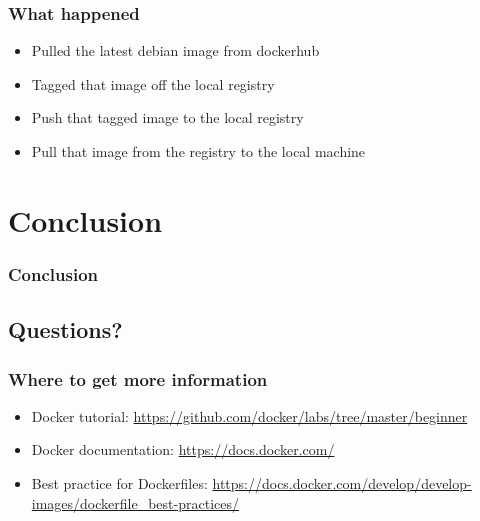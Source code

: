 \documentclass[aspectratio=169,11pt,hyperref={colorlinks=true}]{beamer}
\begin{document}
\begin{frame}
    \frametitle{What happened}
    \begin{itemize}
        \item Pulled the latest debian image from dockerhub
        \item Tagged that image off the local registry
        \item Push that tagged image to the local registry
        \item Pull that image from the registry to the local machine
    \end{itemize}
\end{frame}

\section{Conclusion}
\begin{frame}
    \frametitle{Conclusion}
\end{frame}

\subsection{Questions?}
\begin{frame}
\frametitle{Where to get more information}
    \begin{itemize}
        \item Docker tutorial: \href{https://github.com/docker/labs/tree/master/beginner}{https://github.com/docker/labs/tree/master/beginner}
        \item Docker documentation: \href{https://docs.docker.com/}{https://docs.docker.com/}
        \item Best practice for Dockerfiles: \href{https://docs.docker.com/develop/develop-images/dockerfile\_best-practices/}{https://docs.docker.com/develop/develop-images/dockerfile\_best-practices/}
    \end{itemize}
\end{frame}
\end{document}
